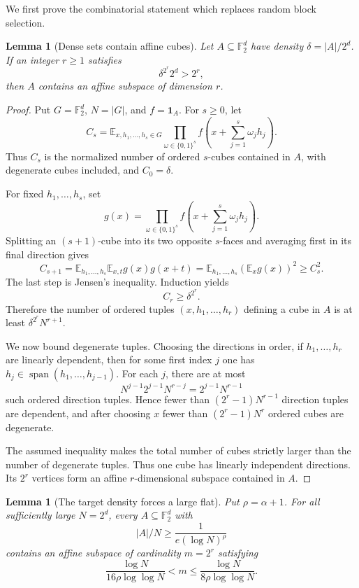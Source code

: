 \documentclass[11pt]{article}
\newtheorem{lemma}[theorem]{Lemma}
\newcommand{\F}{\mathbb F}
\newcommand{\E}{\mathbb E}
\newcommand{\one}{\mathbf 1}
\begin{document}
We first prove the combinatorial statement which replaces random block
selection.

\begin{lemma}[Dense sets contain affine cubes]\label{lem:cube}
Let $A\subseteq\F_2^d$ have density $\delta=|A|/2^d$.  If an integer
$r\ge1$ satisfies
\[
 \delta^{2^r}2^d>2^r,
\]
then $A$ contains an affine subspace of dimension $r$.
\end{lemma}

\begin{proof}
Put $G=\F_2^d$, $N=|G|$, and $f=\one_A$.  For $s\ge0$, let
\[
 C_s=
 \E_{x,h_1,\ldots,h_s\in G}
 \prod_{\omega\in\{0,1\}^s}
 f\left(x+\sum_{j=1}^s\omega_jh_j\right).
\]
Thus $C_s$ is the normalized number of ordered $s$-cubes contained in
$A$, with degenerate cubes included, and $C_0=\delta$.

For fixed $h_1,\ldots,h_s$, set
\[
 g(x)=\prod_{\omega\in\{0,1\}^s}
 f\left(x+\sum_{j=1}^s\omega_jh_j\right).
\]
Splitting an $(s+1)$-cube into its two opposite $s$-faces and averaging
first in its final direction gives
\[
 C_{s+1}
 =\E_{h_1,\ldots,h_s}
   \E_{x,t}g(x)g(x+t)
 =\E_{h_1,\ldots,h_s}(\E_xg(x))^2
 \ge C_s^2.
\]
The last step is Jensen's inequality.  Induction yields
\[
 C_r\ge\delta^{2^r}.
\]
Therefore the number of ordered tuples
$(x,h_1,\ldots,h_r)$ defining a cube in $A$ is at least
$\delta^{2^r}N^{r+1}$.

We now bound degenerate tuples.  Choosing the directions in order, if
$h_1,\ldots,h_r$ are linearly dependent, then for some first index $j$ one
has
$h_j\in\operatorname{span}(h_1,\ldots,h_{j-1})$.  For each $j$, there are
at most
\[
 N^{j-1}2^{j-1}N^{r-j}=2^{j-1}N^{r-1}
\]
such ordered direction tuples.  Hence fewer than
$(2^r-1)N^{r-1}$ direction tuples are dependent, and after choosing $x$
fewer than $(2^r-1)N^r$ ordered cubes are degenerate.

The assumed inequality makes the total number of cubes strictly larger
than the number of degenerate tuples.  Thus one cube has linearly independent
directions.  Its $2^r$ vertices form an affine $r$-dimensional subspace
contained in $A$.
\end{proof}

\begin{lemma}[The target density forces a large flat]\label{lem:scale}
Put $\rho=\alpha+1$.  For all sufficiently large $N=2^d$, every
$A\subseteq\F_2^d$ with
\[
 |A|/N\ge \frac1{e(\log N)^\rho}
\]
contains an affine subspace of cardinality $m=2^r$ satisfying
\[
 \frac{\log N}{16\rho\log\log N}<m
 \le \frac{\log N}{8\rho\log\log N}.
\]
\end{lemma}
\end{document}
